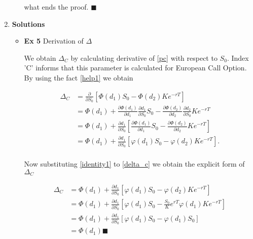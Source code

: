 \documentclass[12pt]{article}
\begin{document}
\begin{enumerate}[leftmargin=\labelsep]
\begin{enumerate}
    what ends the proof. $\blacksquare$
    
\end{enumerate}






\item \textbf{Solutions}

\begin{itemize}
    \item \textbf{Ex 5} Derivation of $\Delta$

We obtain $\Delta_C$ by calculating derivative of \eqref{pc} with respect to $S_0$. Index 'C' informs that this parameter is calculated for European Call Option. By using the fact \eqref{help1} we obtain


\begin{equation}
\begin{split}
 \label{delta_c}
        \Delta_C &= \frac{\partial}{\partial S_0} 
    \left[ \Phi(d_1)S_0 - \Phi(d_2)Ke^{-rT} \right] \\
        &= \Phi(d_1) + 
    \frac{\partial \Phi(d_1) }{\partial d_1} \frac{\partial d_1}{\partial S_0} S_0
    - \frac{\partial \Phi(d_2) }{\partial d_2} \frac{\partial d_2}{\partial S_0}
    Ke^{-rT} \\
        &= \Phi(d_1) + 
     \frac{\partial d_1}{\partial S_0} \left[ 
     \frac{\partial \Phi(d_1) }{\partial d_1}S_0
     - \frac{\partial \Phi(d_2) }{\partial d_2}Ke^{-rT}
     \right] \\
      &= \Phi(d_1) + 
     \frac{\partial d_1}{\partial S_0} \left[ 
     \varphi(d_1)S_0
     -\varphi(d_2)Ke^{-rT}
     \right]. \\   
\end{split}
\end{equation}

Now substituting \eqref{identity1} to \eqref{delta_c} we obtain the explicit form of $\Delta_C$

\begin{equation}
\begin{split}
 \label{delta_c1}
        \Delta_C &=  \Phi(d_1) + 
     \frac{\partial d_1}{\partial S_0} \left[ 
     \varphi(d_1)S_0
     -\varphi(d_2)Ke^{-rT}
     \right]\\   
     &=  \Phi(d_1) + 
     \frac{\partial d_1}{\partial S_0} \left[ 
     \varphi(d_1)S_0
     -\frac{S_0}{K} e^{rT} \varphi(d_1) Ke^{-rT}
     \right]\\  
     &=  \Phi(d_1) + 
     \frac{\partial d_1}{\partial S_0} \left[ 
     \varphi(d_1)S_0
     -\varphi(d_1) S_0
     \right]\\ 
     &=  \Phi(d_1) \blacksquare
\end{split}
\end{equation}


\end{itemize}
\end{enumerate}
\end{document}
